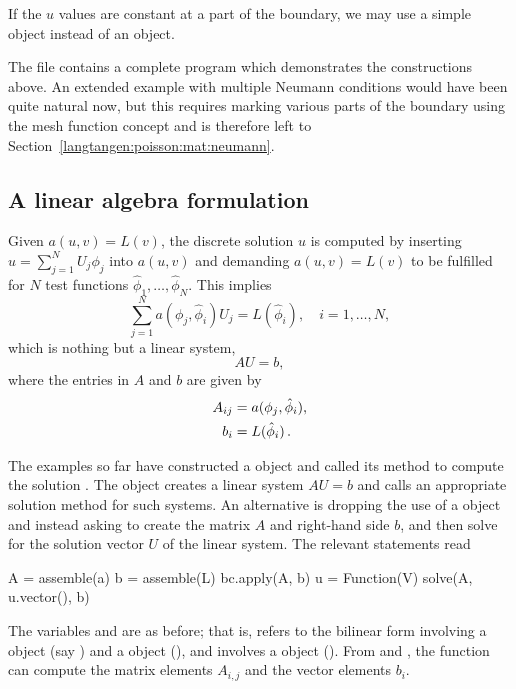 If the $u$ values are constant at a part of the boundary, we may use a
simple  object instead of an
 object.

The file  contains a
complete program which demonstrates the constructions above.  An
extended example with multiple Neumann conditions would have been
quite natural now, but this requires marking various parts of the
boundary using the mesh function concept and is therefore left to
Section~\ref{langtangen:poisson:mat:neumann}.

\subsection{A linear algebra formulation}
\label{langtangen:poisson1:linalg}

Given $a(u,v)=L(v)$, the discrete solution $u$ is computed by
inserting $u=\sum_{j=1}^N U_j \phi_j$ into $a(u,v)$ and demanding
$a(u,v)=L(v)$ to be fulfilled for $N$ test functions
$\hat\phi_1,\ldots,\hat\phi_N$. This implies
\[ \sum_{j=1}^N a(\phi_j,\hat\phi_i) U_j = L(\hat\phi_i),\quad i=1,\ldots,N,\]
which is nothing but a linear system,
\begin{equation}
  AU = b,
\end{equation}
where the entries in $A$ and $b$ are given by
\begin{equation}
\begin{split}
  A_{ij} &= a(\phi_j, \hat{\phi}_i), \\
  b_i &= L(\hat\phi_i)\thinspace .
\end{split}
\end{equation}

The examples so far have constructed a
 object and called its
 method to compute the solution
.  The
 object creates a
linear system $AU=b$ and calls an appropriate solution method for such
systems.  An alternative is dropping the use of a
 object and instead
asking \fenics{} to create the matrix $A$ and right-hand side $b$, and
then solve for the solution vector $U$ of the linear system.  The
relevant statements read
\begin{python}
A = assemble(a)
b = assemble(L)
bc.apply(A, b)
u = Function(V)
solve(A, u.vector(), b)
\end{python}
The variables  and  are as before; that is, 
refers to the bilinear form involving a  object
(say ) and a  object (), and 
involves a  object (). From  and
, the  function can compute the matrix elements
$A_{i,j}$ and the vector elements $b_i$.

